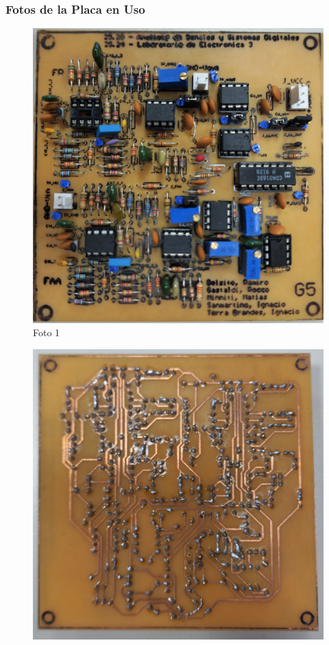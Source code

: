 \subsubsection{Fotos de la Placa en Uso}
\begin{figure}[H]
    \centering
    \begin{minipage}[b]{0.3\textwidth}
        \centering
        \includegraphics[width=\textwidth]{Imagenes/placaFrente.jpg}
        \\[2pt] {\small Foto 1}
    \end{minipage}\hfill
    \begin{minipage}[b]{0.3\textwidth}
        \centering
        \includegraphics[width=\textwidth]{Imagenes/PlacaBottom.jpg}

\end{minipage}
\end{figure}
